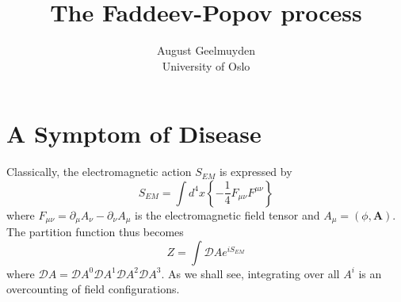 \documentclass[twoside,utf8]{article}
\title{
\fontsize{22pt}{10pt}\selectfont
The Faddeev-Popov process } %
\author{
\large
August Geelmuyden
\\[2mm] %
\normalsize
University of Oslo \\ %
}
\date{}
\begin{document}
\maketitle %

%



\section{A Symptom of Disease}

Classically, the electromagnetic action $S_{EM}$ is expressed by
\[
S_{EM} = \int d^4x \left\{ -\frac{1}{4}F_{\mu\nu}F^{\mu\nu}\right\}
\]
where $ F_{\mu\nu}=\partial_\mu A_\nu - \partial_\nu A_\mu $ is the electromagnetic field tensor and $A_\mu=(\phi,\mathbf{A})$. The partition function thus becomes
\[
Z = \int \mathcal{D}A e^{iS_{EM}}
\]
where $\mathcal{D}A=\mathcal{D}A^0 \mathcal{D}A^1 \mathcal{D}A^2 \mathcal{D}A^3$. As we shall see, integrating over all $A^i$ is an overcounting of field configurations.
\end{document}
